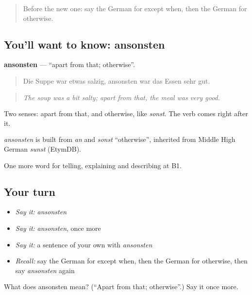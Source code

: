 \label{lesson:GE-C365-ansonsten}



\begin{quote}
Before the new one: say the German for except when, then the German for otherwise.
\end{quote}

\subsection*{You'll want to know: ansonsten}
\textbf{ansonsten} — \textquotedblleft{}apart from that; otherwise\textquotedblright{}.

\begin{quote}
Die Suppe war etwas salzig, ansonsten war das Essen sehr gut.
\end{quote}

\begin{quote}
\emph{The soup was a bit salty; apart from that, the meal was very good.}
\end{quote}

Two senses: apart from that, and otherwise, like \emph{sonst}. The verb comes right after it.

\begin{cousinweb}
\emph{ansonsten} is built from \emph{an} and \emph{sonst} \textquotedblleft{}otherwise\textquotedblright{}, inherited from Middle High German \emph{sunst} (EtymDB).
\end{cousinweb}

\begin{grammarlens}[title={What you've built}]
One more word for telling, explaining and describing at B1.
\end{grammarlens}

\subsection*{Your turn}
\begin{itemize}
\raggedright
  \item \emph{Say it:} \emph{ansonsten}
  \item \emph{Say it:} \emph{ansonsten}, once more
  \item \emph{Say it:} a sentence of your own with \emph{ansonsten}
  \item \emph{Recall:} say the German for except when, then the German for otherwise, then say \emph{ansonsten} again
\end{itemize}

\begin{tcolorbox}[breakable,colback=teal!4,colframe=teal!35!black,title={Before you move on}]
What does ansonsten mean? (\textquotedblleft{}Apart from that; otherwise\textquotedblright{}.) Say it once more.
\end{tcolorbox}
